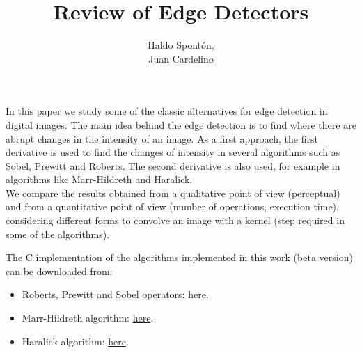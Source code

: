 \documentclass{ipol}
\numberwithin{equation}{section}
\numberwithin{table}{section}
\numberwithin{figure}{section}
\begin{document}
\title{Review of Edge Detectors}
\author{Haldo Spont\'on,\\
        Juan Cardelino}
\date{}
\ipolMaketitle

\begin{ipolAbstract}
In this paper we study some of the classic alternatives for edge detection in digital images. The main idea 
behind the edge detection is to find where there are abrupt changes in the intensity of an image. 
As a first approach, the first derivative is used to find the changes of intensity in several algorithms 
such as Sobel, Prewitt and Roberts. The second derivative is also used, for example in algorithms 
like Marr-Hildreth and Haralick.\\
We compare the results obtained from a qualitative point of view (perceptual) and from a quantitative 
point of view (number of operations, execution time), considering different forms to convolve an 
image with a kernel (step required in some of the algorithms).\\


\end{ipolAbstract}

\begin{ipolCode}
The C implementation of the algorithms implemented in this work (beta version) can be
downloaded from:
\begin{itemize}
	\item Roberts, Prewitt and Sobel operators: \href{http://iie.fing.edu.uy/~haldos/ipol/fded.tar.gz}{here}.
	\item Marr-Hildreth algorithm: \href{http://iie.fing.edu.uy/~haldos/ipol/marr-hildreth.tar.gz}{here}.
	\item Haralick algorithm: \href{http://iie.fing.edu.uy/~haldos/ipol/haralick.tar.gz}{here}.
\end{itemize}
\end{ipolCode}

\end{document}
